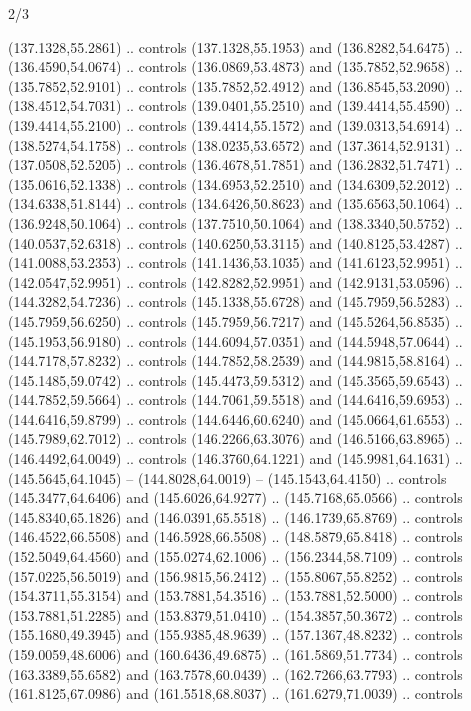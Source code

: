\begin{flagdescription}{2/3}
\begin{scope}[xshift=0.5\flaglength,yshift=0.5\flagwidth,scale=\flagwidth/180]
\begin{scope}[y=0.8pt, x=0.8pt, yscale=-1,shift={(-168.75,-108.75)}]
  (137.1328,55.2861) .. controls (137.1328,55.1953) and (136.8282,54.6475) ..
  (136.4590,54.0674) .. controls (136.0869,53.4873) and (135.7852,52.9658) ..
  (135.7852,52.9101) .. controls (135.7852,52.4912) and (136.8545,53.2090) ..
  (138.4512,54.7031) .. controls (139.0401,55.2510) and (139.4414,55.4590) ..
  (139.4414,55.2100) .. controls (139.4414,55.1572) and (139.0313,54.6914) ..
  (138.5274,54.1758) .. controls (138.0235,53.6572) and (137.3614,52.9131) ..
  (137.0508,52.5205) .. controls (136.4678,51.7851) and (136.2832,51.7471) ..
  (135.0616,52.1338) .. controls (134.6953,52.2510) and (134.6309,52.2012) ..
  (134.6338,51.8144) .. controls (134.6426,50.8623) and (135.6563,50.1064) ..
  (136.9248,50.1064) .. controls (137.7510,50.1064) and (138.3340,50.5752) ..
  (140.0537,52.6318) .. controls (140.6250,53.3115) and (140.8125,53.4287) ..
  (141.0088,53.2353) .. controls (141.1436,53.1035) and (141.6123,52.9951) ..
  (142.0547,52.9951) .. controls (142.8282,52.9951) and (142.9131,53.0596) ..
  (144.3282,54.7236) .. controls (145.1338,55.6728) and (145.7959,56.5283) ..
  (145.7959,56.6250) .. controls (145.7959,56.7217) and (145.5264,56.8535) ..
  (145.1953,56.9180) .. controls (144.6094,57.0351) and (144.5948,57.0644) ..
  (144.7178,57.8232) .. controls (144.7852,58.2539) and (144.9815,58.8164) ..
  (145.1485,59.0742) .. controls (145.4473,59.5312) and (145.3565,59.6543) ..
  (144.7852,59.5664) .. controls (144.7061,59.5518) and (144.6416,59.6953) ..
  (144.6416,59.8799) .. controls (144.6446,60.6240) and (145.0664,61.6553) ..
  (145.7989,62.7012) .. controls (146.2266,63.3076) and (146.5166,63.8965) ..
  (146.4492,64.0049) .. controls (146.3760,64.1221) and (145.9981,64.1631) ..
  (145.5645,64.1045) -- (144.8028,64.0019) -- (145.1543,64.4150) .. controls
  (145.3477,64.6406) and (145.6026,64.9277) .. (145.7168,65.0566) .. controls
  (145.8340,65.1826) and (146.0391,65.5518) .. (146.1739,65.8769) .. controls
  (146.4522,66.5508) and (146.5928,66.5508) .. (148.5879,65.8418) .. controls
  (152.5049,64.4560) and (155.0274,62.1006) .. (156.2344,58.7109) .. controls
  (157.0225,56.5019) and (156.9815,56.2412) .. (155.8067,55.8252) .. controls
  (154.3711,55.3154) and (153.7881,54.3516) .. (153.7881,52.5000) .. controls
  (153.7881,51.2285) and (153.8379,51.0410) .. (154.3857,50.3672) .. controls
  (155.1680,49.3945) and (155.9385,48.9639) .. (157.1367,48.8232) .. controls
  (159.0059,48.6006) and (160.6436,49.6875) .. (161.5869,51.7734) .. controls
  (163.3389,55.6582) and (163.7578,60.0439) .. (162.7266,63.7793) .. controls
  (161.8125,67.0986) and (161.5518,68.8037) .. (161.6279,71.0039) .. controls

\end{scope}
\end{scope}
\end{flagdescription}
